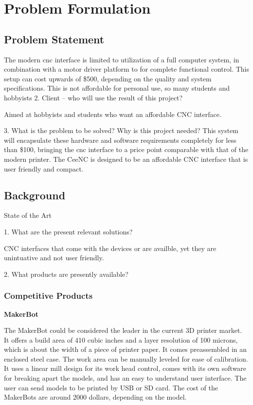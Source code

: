 \chapter{Problem Formulation}
\section{Problem Statement}
The modern \gls{cnc} interface is limited to utilization of a full computer system, in combination with a motor driver platform to for complete functional control.
This setup can cost upwards of \$500, depending on the quality and system specifications.
This is not affordable for personal use, so many students and hobbyists
2. Client – who will use the result of this project?

Aimed at hobbyists and students who want an affordable CNC interface.

3. What is the problem to be solved?  Why is this project needed?
This system will encapsulate these hardware and software requirements completely for less than \$100, bringing the \gls{cnc} interface to a price point comparable with that of the modern printer. 
The CeeNC is designed to be an affordable CNC interface that is user friendly and compact.

\section{Background}

State of the Art

1. What are the present relevant solutions?

CNC interfaces that come with the devices or are availble, yet they are unintuative and not user friendly.

2. What products are presently available?
\subsection{Competitive Products}


\textbf{MakerBot}

The MakerBot could be considered the leader in the current 3D printer market.
It offers a build area of 410 cubic inches and a layer resolution of 100 microns, which is about the width of a piece of printer paper. It comes preassembled in an enclosed steel case. 
The work area can be manually leveled for ease of calibration. 
It uses a linear mill design for its work head control, comes with its own software for breaking apart the models, and has an easy to understand user interface. 
The user can send models to be printed by USB or SD card. 
The cost of the MakerBots are around 2000 dollars, depending on the model.

